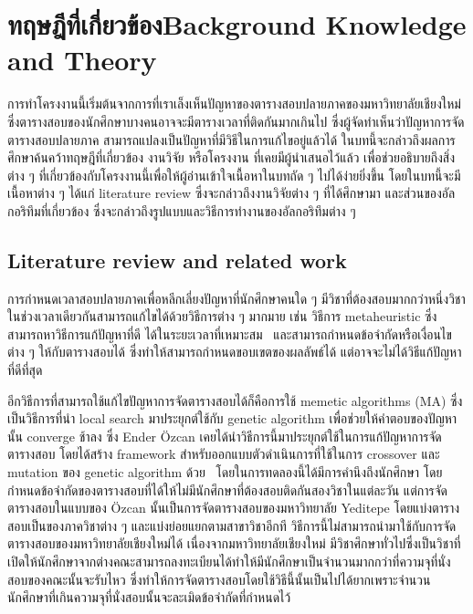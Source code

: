 \chapter{\ifcpe ทฤษฎีที่เกี่ยวข้อง\else Background Knowledge and Theory\fi}

การทำโครงงานนี้เริ่มต้นจากการที่เราเล็งเห็นปัญหาของตารางสอบปลายภาคของมหาวิทยาลัยเชียงใหม่ 
ซึ่งตารางสอบของนักศึกษาบางคนอาจจะมีตารางเวลาที่ติดกันมากเกินไป ซึ่งผู้จัดทำเห็นว่าปัญหาการจัดตารางสอบปลายภาค
สามารถแปลงเป็นปัญหาที่มีวิธีในการแก้ไขอยู่แล้วได้ ในบทนี้จะกล่าวถึงผลการศึกษาค้นคว้าทฤษฎีที่เกี่ยวข้อง งานวิจัย หรือโครงงาน ที่เคยมีผู้นำเสนอไว้แล้ว
เพื่อช่วยอธิบายถึงสิ่งต่าง ๆ ที่เกี่ยวข้องกับโครงงานนี้เพื่อให้ผู้อ่านเข้าใจเนื้อหาในบทถัด ๆ ไปได้ง่ายยิ่งขึ้น โดยในบทนี้จะมีเนื้อหาต่าง ๆ ได้แก่ literature review 
ซึ่งจะกล่าวถึงงานวิจัยต่าง ๆ ที่ได้ศึกษามา และส่วนของอัลกอริทึมที่เกี่ยวข้อง ซึ่งจะกล่าวถึงรูปแบบและวิธีการทำงานของอัลกอริทึมต่าง ๆ 

\section{Literature review and related work}
การกำหนดเวลาสอบปลายภาคเพื่อหลีกเลี่ยงปัญหาที่นักศึกษาคนใด ๆ มีวิชาที่ต้องสอบมากกว่าหนึ่งวิชาในช่วงเวลาเดียวกันสามารถแก้ไขได้ด้วยวิธีการต่าง ๆ มากมาย
เช่น วิธีการ metaheuristic ซึ่งสามารถหาวิธีการแก้ปัญหาที่ดี ได้ในระยะเวลาที่เหมาะสม~\cite{meta-for-vertexcolor}
และสามารถกำหนดข้อจำกัดหรือเงื่อนไขต่าง ๆ ให้กับตารางสอบได้ ซึ่งทำให้สามารถกำหนดขอบเขตของผลลัพธ์ได้ แต่อาจจะไม่ได้วิธีแก้ปัญหาที่ดีที่สุด

อีกวิธีการที่สามารถใช้แก้ไขปัญหาการจัดตารางสอบได้ก็คือการใช้ memetic algorithms (MA) ซึ่งเป็นวิธีการที่นำ local search มาประยุกต์ใช้กับ genetic algorithm 
เพื่อช่วยให้คำตอบของปัญหานั้น converge ช้าลง \cite{pablo-memetic-algo} ซึ่ง Ender {\"O}zcan เคยได้นำวิธีการนี้มาประยุกต์ใช้ในการแก้ปัญหาการจัดตารางสอบ 
โดยได้สร้าง framework สำหรับออกแบบตัวดำเนินการที่ใช้ในการ crossover และ mutation ของ genetic algorithm ด้วย~\cite{fes}
โดยในการทดลองนี้ได้มีการคำนึงถึงนักศึกษา โดยกำหนดข้อจำกัดของตารางสอบที่ได้ให้ไม่มีนักศึกษาที่ต้องสอบติดกันสองวิชาในแต่ละวัน แต่การจัดตารางสอบในแบบของ {\"O}zcan 
นั้นเป็นการจัดตารางสอบของมหาวิทยาลัย Yeditepe โดยแบ่งตารางสอบเป็นของภาควิชาต่าง ๆ และแบ่งย่อยแยกตามสาขาวิชาอีกที วิธีการนี้ไม่สามารถนำมาใช้กับการจัดตารางสอบของมหาวิทยาลัยเชียงใหม่ได้
เนื่องจากมหาวิทยาลัยเชียงใหม่ มีวิชาศึกษาทั่วไปซึ่งเป็นวิชาที่เปิดให้นักศึกษาจากต่างคณะสามารถลงทะเบียนได้ทำให้มีนักศึกษาเป็นจำนวนมากกว่าที่ความจุที่นั่งสอบของคณะนั้นจะรับไหว
ซึ่งทำให้การจัดตารางสอบโดยใช้วิธีนี้นั้นเป็นไปได้ยากเพราะจำนวนนักศึกษาที่เกินความจุที่นั่งสอบนั้นจะละเมิดข้อจำกัดที่กำหนดไว้ 

